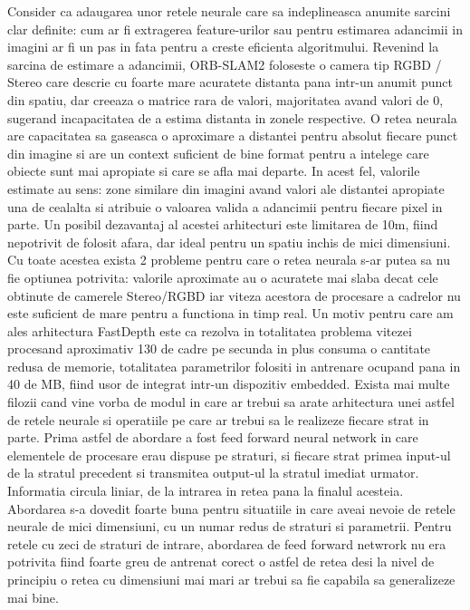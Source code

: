 \documentclass[12pt,a4paper]{report}
\begin{document}
Consider ca adaugarea unor retele neurale care sa indeplineasca anumite sarcini clar definite:
cum ar fi extragerea feature-urilor sau pentru estimarea adancimii in imagini ar fi un pas in fata
pentru a creste eficienta algoritmului. Revenind la sarcina de estimare a adancimii, ORB-SLAM2
foloseste o camera tip RGBD / Stereo care descrie cu foarte mare acuratete distanta pana intr-un
anumit punct din spatiu, dar creeaza o matrice rara de valori, majoritatea avand valori de 0,
sugerand incapacitatea de a estima distanta in zonele respective. O retea neurala are capacitatea 
sa gaseasca o aproximare a distantei pentru absolut fiecare punct din imagine si are un 
context suficient de bine format pentru a intelege care obiecte sunt mai apropiate si care se afla 
mai departe. In acest fel, valorile estimate au sens: zone similare din imagini avand valori 
ale distantei apropiate una de cealalta si atribuie o valoarea valida a adancimii pentru fiecare 
pixel in parte. Un posibil dezavantaj al acestei arhitecturi este limitarea de 10m, fiind nepotrivit
de folosit afara, dar ideal pentru un spatiu inchis de mici dimensiuni. Cu toate acestea exista 2 
probleme pentru care o retea neurala s-ar putea sa nu fie optiunea potrivita: valorile aproximate 
au o acuratete mai slaba decat cele obtinute de camerele Stereo/RGBD iar viteza acestora de 
procesare a cadrelor nu este suficient de mare pentru a functiona in timp real. Un motiv pentru 
care am ales arhitectura FastDepth este ca rezolva in totalitatea problema vitezei procesand 
aproximativ 130 de cadre pe secunda in plus consuma o cantitate redusa de memorie, totalitatea 
parametrilor folositi in antrenare ocupand pana in 40 de MB, fiind usor de integrat intr-un 
dispozitiv embedded. Exista mai multe filozii cand vine vorba de modul in care ar trebui sa
arate arhitectura unei astfel de retele neurale si operatiile pe care ar trebui sa le realizeze
fiecare strat in parte. Prima astfel de abordare a fost feed forward neural network in care 
elementele de procesare erau dispuse pe straturi, si fiecare strat primea input-ul de la stratul 
precedent si transmitea output-ul la stratul imediat urmator. Informatia circula liniar, de la 
intrarea in retea pana la finalul acesteia. Abordarea s-a dovedit foarte buna pentru situatiile 
in care aveai nevoie de retele neurale de mici dimensiuni, cu un numar redus de straturi si 
parametrii. Pentru retele cu zeci de straturi de intrare, abordarea de feed forward netwrork 
nu era potrivita fiind foarte greu de antrenat corect o astfel de retea desi la nivel de principiu
o retea cu dimensiuni mai mari ar trebui sa fie capabila sa generalizeze mai bine.    
\end{document}
